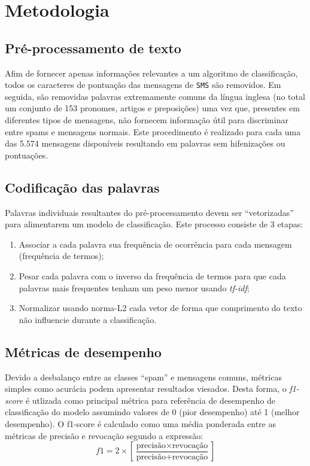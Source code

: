 \documentclass[a4paper,11pt]{article}
\begin{document}





\section{Metodologia}


\subsection{Pré-processamento de texto}

Afim de fornecer apenas informações relevantes a um algoritmo de classificação, todos os 
caracteres de pontuação das mensagens de \texttt{SMS} são removidos. Em seguida, são 
removidas palavras extremamente comuns da língua inglesa (no total um conjunto de 153 pronomes, 
artigos e preposições) uma vez que, presentes em diferentes tipos de mensagens, não fornecem 
informação útil para discriminar entre spams e mensagens normais. Este procedimento é realizado 
para cada uma das 5.574 mensagens disponíveis resultando em palavras sem hifenizações ou 
pontuações.


\subsection{Codificação das palavras}

Palavras individuais resultantes do pré-processamento devem ser ``vetorizadas'' para alimentarem 
um modelo de classificação. Este processo consiste de 3 etapas:
\begin{enumerate}
 \item Associar a cada palavra sua frequência de ocorrência para cada mensagem (frequência
 de termos);
 \item Pesar cada palavra com o inverso da frequência de termos para que cada palavras mais 
 frequentes tenham um peso menor usando \textit{tf-idf};
 \item Normalizar usando norma-L2 cada vetor de forma que comprimento do texto não influencie 
 durante a classificação.
\end{enumerate}



\subsection{Métricas de desempenho}

Devido a desbalanço entre as classes ``spam'' e mensagens comuns, métricas simples como acurácia 
podem apresentar resultados viesados. Desta forma, o \textit{f1-score} é utlizada como 
principal métrica para referência de desempenho de classificação do modelo assumindo valores de 
0 (pior desempenho) até 1 (melhor desempenho). O f1-score é calculado como uma média ponderada 
entre as métricas de precisão e revocação segundo a expressão:
\begin{equation}
 f1 = 2 \times \left[ \frac{\mbox{precisão} \times \mbox{revocação}}{\mbox{precisão} + \mbox{revocação}} \right]
\end{equation}
\end{document}
